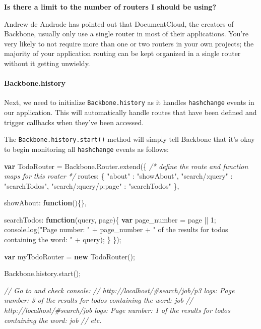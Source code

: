 \documentclass[9pt]{book}
\newenvironment{Shaded}{}{}
\newcommand{\KeywordTok}[1]{\textcolor[rgb]{0.00,0.44,0.13}{\textbf{{#1}}}}
\newcommand{\DataTypeTok}[1]{\textcolor[rgb]{0.56,0.13,0.00}{{#1}}}
\newcommand{\DecValTok}[1]{\textcolor[rgb]{0.25,0.63,0.44}{{#1}}}
\newcommand{\StringTok}[1]{\textcolor[rgb]{0.25,0.44,0.63}{{#1}}}
\newcommand{\CommentTok}[1]{\textcolor[rgb]{0.38,0.63,0.69}{\textit{{#1}}}}
\newcommand{\OtherTok}[1]{\textcolor[rgb]{0.00,0.44,0.13}{{#1}}}
\newcommand{\FunctionTok}[1]{\textcolor[rgb]{0.02,0.16,0.49}{{#1}}}
\newcommand{\NormalTok}[1]{{#1}}
\begin{document}
\textbf{Is there a limit to the number of routers I should be using?}

Andrew de Andrade has pointed out that DocumentCloud, the creators of
Backbone, usually only use a single router in most of their
applications. You're very likely to not require more than one or two
routers in your own projects; the majority of your application routing
can be kept organized in a single router without it getting unwieldy.

\paragraph{Backbone.history}\label{backbone.history}

Next, we need to initialize \texttt{Backbone.history} as it handles
\texttt{hashchange} events in our application. This will automatically
handle routes that have been defined and trigger callbacks when they've
been accessed.

The \texttt{Backbone.history.start()} method will simply tell Backbone
that it's okay to begin monitoring all \texttt{hashchange} events as
follows:

\begin{Shaded}
\begin{Highlighting}[]
\KeywordTok{var} \NormalTok{TodoRouter = }\OtherTok{Backbone}\NormalTok{.}\OtherTok{Router}\NormalTok{.}\FunctionTok{extend}\NormalTok{(\{}
  \CommentTok{/* define the route and function maps for this router */}
  \DataTypeTok{routes}\NormalTok{: \{}
    \StringTok{"about"} \NormalTok{: }\StringTok{"showAbout"}\NormalTok{,}
    \StringTok{"search/:query"} \NormalTok{: }\StringTok{"searchTodos"}\NormalTok{,}
    \StringTok{"search/:query/p:page"} \NormalTok{: }\StringTok{"searchTodos"}
  \NormalTok{\},}

  \DataTypeTok{showAbout}\NormalTok{: }\KeywordTok{function}\NormalTok{()\{\},}

  \DataTypeTok{searchTodos}\NormalTok{: }\KeywordTok{function}\NormalTok{(query, page)\{}
    \KeywordTok{var} \NormalTok{page_number = page || }\DecValTok{1}\NormalTok{;}
    \OtherTok{console}\NormalTok{.}\FunctionTok{log}\NormalTok{(}\StringTok{"Page number: "} \NormalTok{+ page_number + }\StringTok{" of the results for todos containing the word: "} \NormalTok{+ query);}
  \NormalTok{\}}
\NormalTok{\});}

\KeywordTok{var} \NormalTok{myTodoRouter = }\KeywordTok{new} \FunctionTok{TodoRouter}\NormalTok{();}

\OtherTok{Backbone}\NormalTok{.}\OtherTok{history}\NormalTok{.}\FunctionTok{start}\NormalTok{();}

\CommentTok{// Go to and check console:}
\CommentTok{// http://localhost/#search/job/p3   logs: Page number: 3 of the results for todos containing the word: job}
\CommentTok{// http://localhost/#search/job      logs: Page number: 1 of the results for todos containing the word: job }
\CommentTok{// etc.}
\end{Highlighting}
\end{Shaded}
\end{document}
